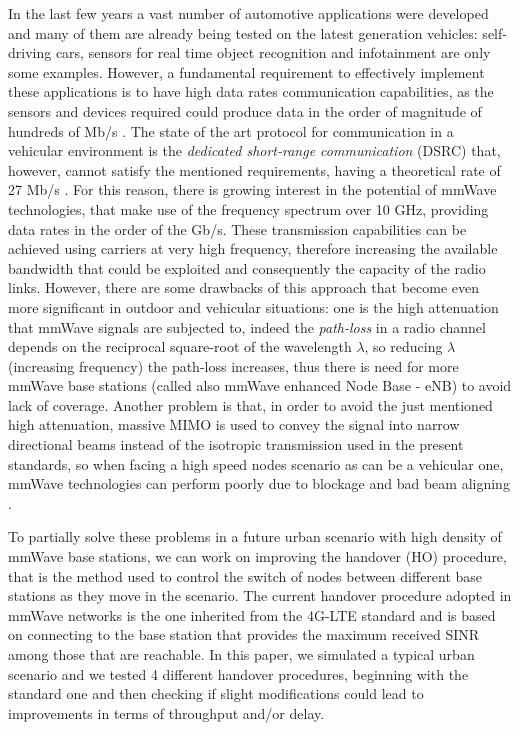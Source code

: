 \documentclass[conference,10pt]{IEEEtran}
\begin{document}
In the last few years a vast number of automotive applications were developed and many of them are already being tested on the latest generation vehicles: self-driving cars, sensors for real time object recognition and infotainment are only some examples. However, a fundamental requirement to effectively implement these applications is to have high data rates communication capabilities, as the sensors and devices required could produce data in the order of magnitude of hundreds of Mb/s \cite{surveh}.
The state of the art protocol for communication in a vehicular environment is the \emph{dedicated short-range communication} (DSRC) that, however, cannot satisfy the mentioned requirements, having a theoretical rate of 27 Mb/s \cite{surveh}. For this reason, there is growing interest in the potential of mmWave technologies, that make use of the frequency spectrum over 10 GHz, providing data rates in the order of the Gb/s. These transmission capabilities can be achieved using carriers at very high frequency, therefore increasing the available bandwidth that could be exploited and consequently the capacity of the radio links. However, there are some drawbacks of this approach that become even more significant in outdoor and vehicular situations: one is the high attenuation that mmWave signals are subjected to, indeed the \emph{path-loss} in a radio channel depends on the reciprocal square-root of the wavelength $\lambda$, so reducing $\lambda$ (increasing frequency) the path-loss increases, thus there is need for more mmWave base stations (called also mmWave enhanced Node Base - eNB) to avoid lack of coverage. Another problem is that, in order to avoid the just mentioned high attenuation, massive MIMO is used to convey the signal into narrow directional beams instead of the isotropic transmission used in the present standards, so when facing a high speed nodes scenario as can be a vehicular one, mmWave technologies can perform poorly due to blockage and bad beam aligning \cite{mmvehicle}.

To partially solve these problems in a future urban scenario with high density of mmWave base stations, we can work on improving the handover (HO) procedure, that is the method used to control the switch of nodes between different base stations as they move in the scenario. The current handover procedure adopted in mmWave networks is the one inherited from the 4G-LTE standard and is based on connecting to the base station that provides the maximum received SINR among those that are reachable. In this paper, we simulated a typical urban scenario and we tested 4 different handover procedures, beginning with the standard one and then checking if slight modifications could lead to improvements in terms of throughput and/or delay.
\end{document}
